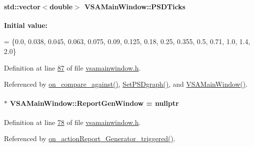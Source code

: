\paragraph[{P\+S\+D\+Ticks}]{\setlength{\rightskip}{0pt plus 5cm}std\+::vector$<$double$>$ V\+S\+A\+Main\+Window\+::\+P\+S\+D\+Ticks\hspace{0.3cm}{\ttfamily [private]}}\label{class_v_s_a_main_window_a43651d26dd4d6d8971317d902294317c}
{\bfseries Initial value\+:}
\begin{DoxyCode}
= \{0.0,  0.038, 0.045, 0.063, 0.075,
                              0.09, 0.125, 0.18,  0.25,  0.355,
                              0.5,  0.71,  1.0,   1.4,   2.0\}
\end{DoxyCode}


Definition at line \hyperlink{vsamainwindow_8h_source_l00087}{87} of file \hyperlink{vsamainwindow_8h_source}{vsamainwindow.\+h}.



Referenced by \hyperlink{vsamainwindow_8cpp_source_l00570}{on\+\_\+compare\+\_\+against()}, \hyperlink{vsamainwindow_8cpp_source_l00285}{Set\+P\+S\+Dgraph()}, and \hyperlink{vsamainwindow_8cpp_source_l00004}{V\+S\+A\+Main\+Window()}.

\hypertarget{class_v_s_a_main_window_a38a41496820a4c6ad8220c02d19ab77c}{}
\paragraph[{Report\+Gen\+Window}]{$\ast$ V\+S\+A\+Main\+Window\+::\+Report\+Gen\+Window = nullptr\hspace{0.3cm}{\ttfamily [private]}}\label{class_v_s_a_main_window_a38a41496820a4c6ad8220c02d19ab77c}


Definition at line \hyperlink{vsamainwindow_8h_source_l00078}{78} of file \hyperlink{vsamainwindow_8h_source}{vsamainwindow.\+h}.



Referenced by \hyperlink{vsamainwindow_8cpp_source_l00552}{on\+\_\+action\+Report\+\_\+\+Generator\+\_\+triggered()}.

\hypertarget{class_v_s_a_main_window_afe7a5404f6f35af0c40eb277d91b82ac}{}
